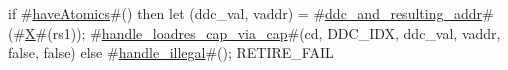 if #\hyperref[sailRISCVzhaveAtomics]{haveAtomics}#() then {
  let (ddc_val, vaddr) = #\hyperref[sailRISCVzddczyandzyresultingzyaddr]{ddc\_and\_resulting\_addr}#(#\hyperref[sailRISCVzX]{X}#(rs1));
  #\hyperref[sailRISCVzhandlezyloadreszycapzyviazycap]{handle\_loadres\_cap\_via\_cap}#(cd, DDC_IDX, ddc_val, vaddr, false, false)
} else {
  #\hyperref[sailRISCVzhandlezyillegal]{handle\_illegal}#();
  RETIRE_FAIL
}
